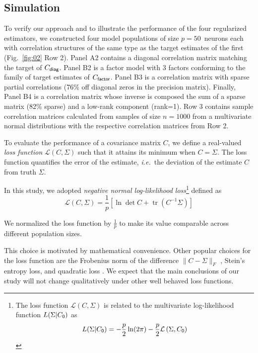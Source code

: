 \documentclass[10pt]{article}
\DeclareMathOperator{\Tr}{tr}
\newcommand{\loss}[1]{\mathcal L\left(#1\right)}
\begin{document}
\subsection*{Simulation}
To verify our approach and to illustrate the performance of the four regularized estimators, we constructed four model populations of size $p=50$~neurons each with correlation structures of the same type as the target estimates of the first (Fig.~\ref{fig:02} Row 2). Panel A2 contains a diagonal correlation matrix matching the target of $C_{\sf diag}$. Panel B2 is a factor model with 3 factors conforming to the family of target estimates of $C_{\sf factor}$. Panel B3 is a correlation matrix with sparse partial correlations (76\% off diagonal zeros in the precision matrix). Finally, Panel B4 is a correlation matrix whose inverse is composed the sum of a sparse matrix (82\% sparse) and a low-rank component (rank=1).
Row 3 contains sample correlation matrices calculated from samples of size $n=1000$ from a multivariate normal distributions with the respective correlation matrices from Row 2.

To evaluate the performance of a covariance matrix $C$, we define a real-valued \emph{loss function} $\loss{C,\Sigma}$ such that it attains its minimum when $C=\Sigma$.  The loss function quantifies the error of the estimate, \emph{i.e.}~the deviation of the estimate $C$ from truth $\Sigma$.

In this study, we adopted \emph{negative normal log-likelihood loss}\footnote{
The loss function $\loss{C,\Sigma}$ is related to the multivariate log-likelihood function $L(\Sigma|C_{\sf 0})$ as
\begin{equation*}
    L(\Sigma|C_{\sf 0}) = -\frac p 2 \ln(2\pi) -\frac p 2 \loss{\Sigma,C_{\sf 0}}
\end{equation*}
}
defined as
\begin{equation}\label{eq:loss}
    \loss{C,\Sigma} = \frac 1 p\left[\ln \det C + \Tr(C^{-1}\Sigma)\right]
\end{equation}

We normalized the loss function  by $\frac 1 p$ to make its value comparable across different population sizes. 

This choice is motivated by mathematical convenience. Other popular choices for the loss function are the Frobenius norm of the difference $\|C-\Sigma\|_F$ \cite{Ledoit:2004,Schafer:2005}, Stein's entropy loss, and quadratic loss \cite{James:1961,Fan:2008}.  We expect that the main conclusions of our study will not change qualitatively under other well behaved loss functions.
\end{document}
